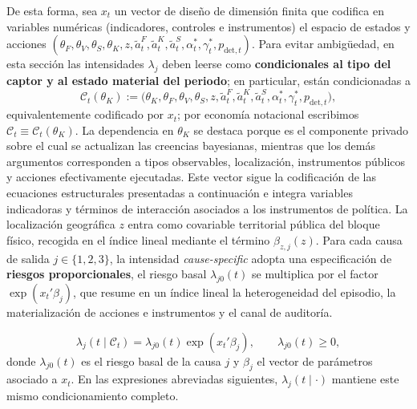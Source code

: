 \documentclass[12pt]{article}
\theoremstyle{definition}
\theoremstyle{remark}
\newcommand{\1}{\mathbf{1}}
\begin{document}
De esta forma, sea $x_t$ un vector de diseño de dimensión finita que codifica en variables numéricas \textup{(}indicadores, controles e instrumentos\textup{)} el espacio de estados y acciones $(\theta_F, \theta_V, \theta_S, \theta_K, z, \tilde{a}_t^F, \tilde{a}_t^K, \tilde{a}_t^S, \alpha_t^\ast, \gamma_t^\ast, p_{\mathrm{det},t})$. Para evitar ambigüedad, en esta sección las intensidades $\lambda_j$ deben leerse como \textbf{condicionales al tipo del captor y al estado material del periodo}; en particular, están condicionadas a
\[
\mathcal{C}_t(\theta_K)
:=
\bigl(\theta_K,\theta_F,\theta_V,\theta_S,z,
\tilde{a}_t^F,\tilde{a}_t^K,\tilde{a}_t^S,
\alpha_t^\ast,\gamma_t^\ast,p_{\mathrm{det},t}\bigr),
\]
equivalentemente codificado por $x_t$; por economía notacional escribimos $\mathcal{C}_t\equiv\mathcal{C}_t(\theta_K)$. La dependencia en $\theta_K$ se destaca porque es el componente privado sobre el cual se actualizan las creencias bayesianas, mientras que los demás argumentos corresponden a tipos observables, localización, instrumentos públicos y acciones efectivamente ejecutadas. Este vector sigue la codificación de las ecuaciones estructurales presentadas a continuación e integra variables indicadoras y términos de interacción asociados a los instrumentos de política. La localización geográfica $z$ entra como covariable territorial pública del bloque físico, recogida en el índice lineal mediante el término $\beta_{z,j}(z)$. Para cada causa de salida $j \in \{1, 2, 3\}$, la intensidad \textit{cause-specific} adopta una especificación de \textbf{riesgos proporcionales}, el riesgo basal $\lambda_{j0}(t)$ se multiplica por el factor $\exp(x_t'\beta_j)$, que resume en un índice lineal la heterogeneidad del episodio, la materialización de acciones e instrumentos y el canal de auditoría.

\[
\lambda_j(t\mid\mathcal{C}_t)
=
\lambda_{j0}(t)\exp\left( x_t' \beta_j \right),
\qquad
\lambda_{j0}(t)\ge 0,
\]
donde $\lambda_{j0}(t)$ es el riesgo basal de la causa $j$ y $\beta_j$ el vector de parámetros asociado a $x_t$. En las expresiones abreviadas siguientes, $\lambda_j(t\mid\cdot)$ mantiene este mismo condicionamiento completo.
\end{document}
